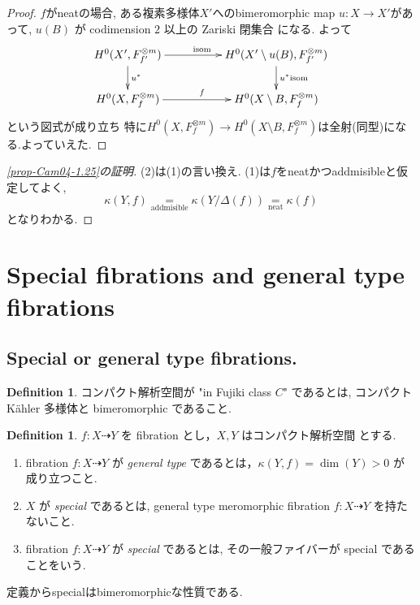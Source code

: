 \documentclass[dvipdfmx,a4paper,11pt]{article} %
\theoremstyle{definition}
\newtheorem{defn}[thm]{Definition}
\theoremstyle{remark}
\numberwithin{equation}{section}
\begin{document}
\begin{proof}
$f$がneatの場合, ある複素多様体$X'$へのbimeromorphic map $u : X \to X'$があって, \(u(B)\) が codimension \(2\) 以上の Zariski 閉集合 になる. 
よって
 \[
\xymatrix@C=50pt@R=20pt{
H^0(X', F_{f'}^{\otimes m}) \ar@{->}[d]^{u^{*} }\ar@{->}[r]^{ \text{isom}} &H^0(X' \setminus u(B), F_{f'}^{\otimes m})\ar@{->}[d]^{u^{*} \text{isom}}\\
H^0(X, F_{f}^{\otimes m}) \ar@{->}[r]^{f} & H^0(X \setminus B, F_{f}^{\otimes m}) \\
}
\]
という図式が成り立ち 特に$H^0(X, F_{f}^{\otimes m}) \to H^0(X \setminus B, F_{f}^{\otimes m})$は全射(同型)になる.よっていえた.
\end{proof}

\begin{proof}[\ref{prop-Cam04-1.25}の証明]
(2)は(1)の言い換え. 
(1)は$f$をneatかつaddmisibleと仮定してよく, 
$$
\kappa(Y, f) \underset{\text{addmisible}}{=}\kappa(Y/\Delta(f))
\underset{\text{neat}}{=}\kappa(f)
$$
となりわかる. 
\end{proof}

\section{Special fibrations and general type fibrations}

\subsection{Special or general type fibrations. \cite[2.1]{Cam04}}

\begin{defn}
コンパクト解析空間が "in Fujiki class  $C$" であるとは, コンパクト Kähler 多様体と bimeromorphic であること. 
\end{defn}

\begin{defn}
\label{defn-Cam04-special}
\(f : X \dashrightarrow Y\) を fibration とし，\(X,Y\) はコンパクト解析空間 とする.
\begin{enumerate}
\item fibration \(f : X \dashrightarrow Y\) が \emph{general type} であるとは，\(\kappa(Y,f)=\dim(Y)>0\) が成り立つこと. 
\item \(X\) が \emph{special} であるとは, general type meromorphic fibration \(f : X \dashrightarrow Y\) を持たないこと. 
\item fibration \(f : X \dashrightarrow Y\) が \emph{special} であるとは, その一般ファイバーが special であることをいう.
\end{enumerate}
\end{defn}
定義からspecialはbimeromorphicな性質である. 
\end{document}
